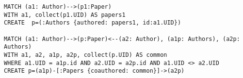 \begin{lstlisting}[caption={Graph Nesting in Neo4J using Cypher as a Query Language. Please note that, even in this case, is it not possible to return one single nested graph immediately, and hence the nested vertices must be created before creating the nested edges.},language=Cypher,frameround=fttt,frame=trBL,mathescape=true,label=Neo4JQuery]
MATCH (a1: Author)-->(p1:Paper) 
WITH a1, collect(p1.UID) AS papers1 
CREATE  p=(:Authors {authored: papers1, id:a1.UID})

MATCH (a1: Author)-->(p:Paper)<--(a2: Author), (a1p: Authors), (a2p: Authors)
WITH a1, a2, a1p, a2p, collect(p.UID) AS common
WHERE a1.UID = a1p.id AND a2.UID = a2p.id AND a1.UID <> a2.UID
CREATE p=(a1p)-[:Papers {coauthored: common}]->(a2p)
\end{lstlisting}

%
